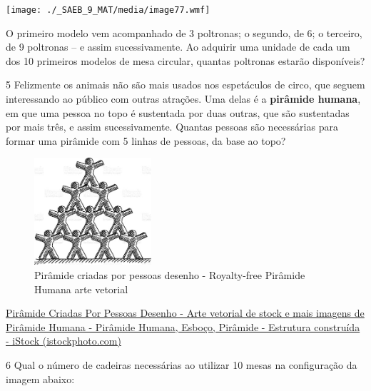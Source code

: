 {{{\begin{escolha}
{\texttt{[image: ./\_SAEB\_9\_MAT/media/image77.wmf]}

O primeiro modelo vem acompanhado de 3 poltronas; o segundo, de 6; o 
terceiro, de 9 poltronas -- e assim sucessivamente. Ao adquirir uma
unidade de cada um dos 10 primeiros modelos de mesa circular, quantas
poltronas estarão disponíveis?


\num{5} Felizmente os animais não são mais usados nos espetáculos de circo,
que seguem interessando ao público com outras atrações. Uma delas é a 
\textbf{pirâmide humana}, em que uma pessoa no topo é sustentada por duas
outras, que são sustentadas por mais três, e assim sucessivamente. Quantas
pessoas são necessárias para formar uma pirâmide com 5 linhas de pessoas,
da base ao topo?

\begin{figure}
\centering
\includegraphics[width=1.71354in,height=1.56302in]{./_SAEB_9_MAT/media/image82.jpeg}
\caption{Pirâmide criadas por pessoas desenho - Royalty-free Pirâmide
Humana arte vetorial}
\end{figure}

\href{https://www.istockphoto.com/pt/vetorial/pir\%C3\%A2mide-criadas-por-pessoas-desenho-gm499201238-79908399?phrase=pir\%C3\%A2mide\%20humana}{Pirâmide
Criadas Por Pessoas Desenho - Arte vetorial de stock e mais imagens de
Pirâmide Humana - Pirâmide Humana, Esboço, Pirâmide - Estrutura
construída - iStock (istockphoto.com)}



\num{6} Qual o número de cadeiras necessárias ao utilizar 10 mesas na
configuração da imagem abaixo:

}
\end{escolha}}}}
